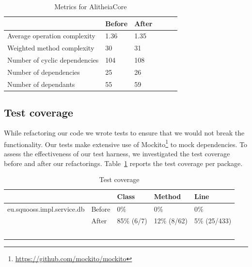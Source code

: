 \documentclass{article}
\begin{document}
\begin{table}
	\centering
    \begin{tabular}{l|llll}
    ~                                 & Before & After & ~ & ~ \\ \hline
    Average operation complexity      & 1.36   & 1.35 \\
    Weighted method complexity        & 30     & 31 \\
    Number of cyclic dependencies     & 104 & 108 \\
    Number of dependencies            & 25  & 26  \\
    Number of dependants              & 55  & 59  \\
    \end{tabular}
    \caption{Metrics for AlitheiaCore}
\end{table}

\subsection{Test coverage}
While refactoring our code we wrote tests to ensure that we would not break the functionality. Our tests make extensive use of Mockito\footnote{\url{https://github.com/mockito/mockito}} to mock dependencies. To assess the effectiveness of our test harness, we investigated the test coverage before and after our refactorings. Table~\ref{tbl:coverage} reports the test coverage per package.

\begin{table}[h]
	\centering
    \begin{tabular}{ll|lll}
    ~                          & ~      & Class      & Method      & Line         \\ \hline
    eu.squooss.impl.service.db & Before & 0\%        & 0\%         & 0\%          \\
    ~                          & After  & 85\% (6/7) & 12\% (8/62) & 5\% (25/433) \\ \hline
    ~                          & ~      & ~          & ~           & ~            \\
    \end{tabular}
    \caption{Test coverage}
    \label{tbl:coverage}
\end{table}



\end{document}
